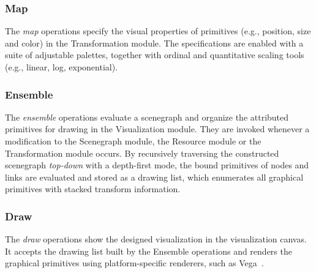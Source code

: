  \subsubsection{Map} The \emph{map} operations specify the visual properties of primitives (e.g., position, size and color) in the Transformation module. The specifications are enabled with a suite of adjustable palettes, together with ordinal and quantitative scaling tools (e.g., linear, log, exponential).

 \subsubsection{Ensemble} The \emph{ensemble} operations evaluate a scenegraph and organize the attributed primitives for drawing in the Visualization module. They are invoked whenever a modification to the Scenegraph module, the Resource module or the Transformation module occurs. By recursively traversing the constructed scenegraph \emph{top-down} with a depth-first mode, the bound primitives of nodes and links are evaluated and stored as a drawing list, which enumerates all graphical primitives with stacked transform information.

 \subsubsection{Draw} The \emph{draw} operations show the designed visualization in the visualization canvas. It accepts the drawing list built by the Ensemble operations and renders the graphical primitives using platform-specific renderers, such as Vega~\cite{Vega}.


